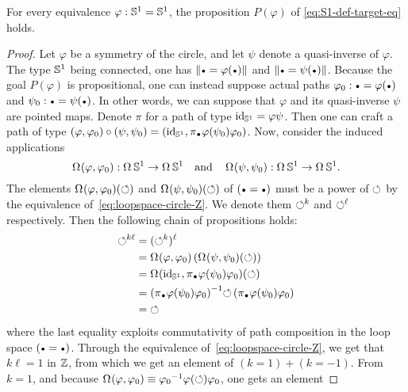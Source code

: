 \documentclass[english,a4]{article}
\begin{document}
\begin{proposition}
  \label{prop:S1-eq-either}%
  For every equivalence $\varphi:{{\mathbb S^{1}}}={{\mathbb S^{1}}}$, the proposition
  $P(\varphi)$ of \cref{eq:S1-def-target-eq} holds.
\end{proposition}
\begin{proof}
  Let $\varphi$ be a symmetry of the circle, and let $\psi$ denote a
  quasi-inverse of $\varphi$. The type ${{\mathbb S^{1}}}$ being connected, one
  has $\Trunc{\base=\varphi(\base)}$ and
  $\Trunc{\base=\psi(\base)}$. Because the goal $P(\varphi)$ is
  propositional, one can instead suppose actual paths
  $\varphi_0\from\base=\varphi(\base)$ and
  $\psi_0\from\base=\psi(\base)$. In other words, we can suppose that
  $\varphi$ and its quasi-inverse $\psi$ are pointed maps. Denote
  $\pi$ for a path of type $\mathord{\mathrm{id}}_{{\mathbb S^{1}}}=\varphi\psi$. Then one can craft a
  path of type
  $(\varphi,\varphi_0) \circ (\psi,\psi_0) =
  (\id_\Sc,\pi_{\base}\varphi(\psi_0)\varphi_0)$. Now, consider the
  induced applications
  \begin{displaymath}
    \mathop{\Omega^{}} (\varphi,\varphi_0) : \mathop{\Omega^{}} {{\mathbb S^{1}}} \to \mathop{\Omega^{}} {{\mathbb S^{1}}}
    \quad\text{and}\quad
    \mathop{\Omega^{}} (\psi,\psi_0) : \mathop{\Omega^{}} {{\mathbb S^{1}}} \to \mathop{\Omega^{}} {{\mathbb S^{1}}}.
  \end{displaymath}
  The elements $\mathop{\Omega^{}} (\varphi,\varphi_0) (\mathord{\circlearrowleft})$ and
  $\mathop{\Omega^{}} (\psi,\psi_0) (\mathord{\circlearrowleft})$ of $(\base=\base)$ must be a
  power of $\mathord{\circlearrowleft}$ by the equivalence
  of~\cref{eq:loopspace-circle-Z}. We denote them $\mathord{\circlearrowleft}^k$ and
  $\mathord{\circlearrowleft}^\ell$ respectively. Then the following chain of propositions
  holds:
  \begin{align*}
    \Sloop^{k\ell} &= (\Sloop^k)^\ell\\
    &= \loopspace{} (\varphi,\varphi_0) \left(
      \loopspace{} (\psi,\psi_0) (\Sloop)
    \right)\\
    &= \loopspace{} (\id_\Sc,\pi_{\base}\varphi(\psi_0)\varphi_0) (\Sloop)\\
    &= \inv{\left(\pi_{\base}\varphi(\psi_0)\varphi_0\right)} \Sloop
      \left(\pi_{\base}\varphi(\psi_0)\varphi_0\right)\\
    &= \Sloop
  \end{align*}
  where the last equality exploits commutativity of path composition
  in the loop space $(\base = \base)$. Through the equivalence
  of~\cref{eq:loopspace-circle-Z}, we get that $k\ell=1$ in $\mathbb{Z}$,
  from which we get an element of $(k=1)+(k=-1)$. From $k=1$, and
  because
  $\mathop{\Omega^{}} (\varphi,\varphi_0) \equiv {\varphi_0}^{-1}
  \varphi(\mathord{\circlearrowleft}) \varphi_0$, one gets an element

\end{proof}
\end{document}
